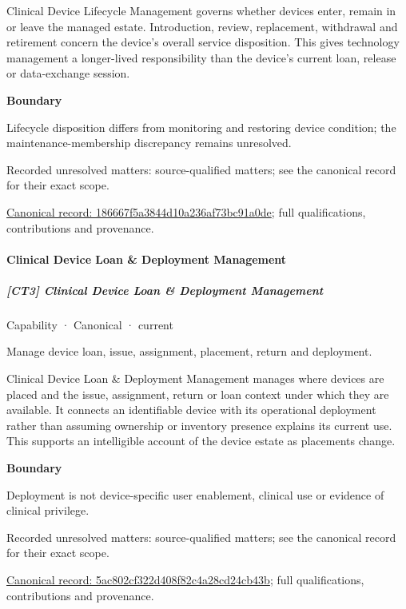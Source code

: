 Clinical Device Lifecycle Management governs whether devices enter, remain in or leave the managed estate. Introduction, review, replacement, withdrawal and retirement concern the device's overall service disposition. This gives technology management a longer-lived responsibility than the device's current loan, release or data-exchange session.



\textbf{Boundary}



Lifecycle disposition differs from monitoring and restoring device condition; the maintenance-membership discrepancy remains unresolved.


{\small Recorded unresolved matters: source-qualified matters; see the canonical record for their exact scope.}\par
{\footnotesize \href{../../../../continuum/strategy/capability/186667f5a3844d10a236af73bc91a0de.md}{Canonical record: 186667f5a3844d10a236af73bc91a0de}; full qualifications, contributions and provenance.}\par
\paragraph{Clinical Device Loan \& Deployment Management}

\subparagraph{[CT3] Clinical Device Loan \& Deployment Management}

\label{element:5ac802cf322d408f82c4a28cd24cb43b}
{\small Capability · Canonical · current}\par

Manage device loan, issue, assignment, placement, return and deployment.



Clinical Device Loan \& Deployment Management manages where devices are placed and the issue, assignment, return or loan context under which they are available. It connects an identifiable device with its operational deployment rather than assuming ownership or inventory presence explains its current use. This supports an intelligible account of the device estate as placements change.



\textbf{Boundary}



Deployment is not device-specific user enablement, clinical use or evidence of clinical privilege.


{\small Recorded unresolved matters: source-qualified matters; see the canonical record for their exact scope.}\par
{\footnotesize \href{../../../../continuum/strategy/capability/5ac802cf322d408f82c4a28cd24cb43b.md}{Canonical record: 5ac802cf322d408f82c4a28cd24cb43b}; full qualifications, contributions and provenance.}\par
